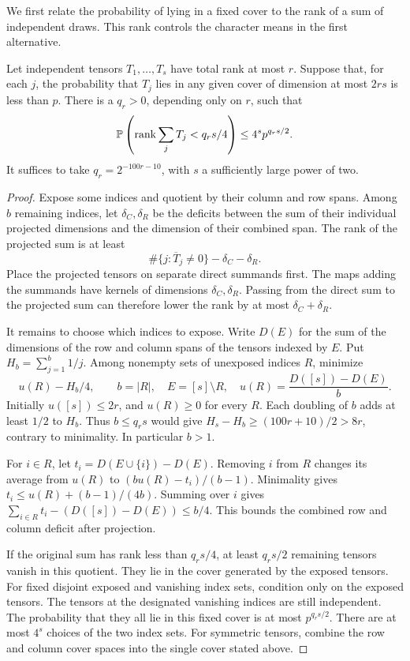 We first relate the probability of lying in a fixed cover to the
rank of a sum of independent draws. This rank controls the character
means in the first alternative.

\begin{lemma}\label{lem:no-cover-rank}
Let independent tensors \(T_1,\ldots,T_s\) have total rank at most \(r\).
Suppose that, for each \(j\), the probability that \(T_j\) lies in any
given cover of dimension at most \(2rs\) is less than \(p\). There is a
\(q_r>0\), depending only on \(r\), such that
\[
 \mathbb P\left(\operatorname{rank}\sum_jT_j<q_rs/4\right)\le4^sp^{q_rs/2}.
\]
It suffices to take \(q_r=2^{-100r-10}\), with \(s\) a sufficiently
large power of two.
\end{lemma}
\begin{proof}
Expose some indices and quotient by their column and row spans. Among
\(b\) remaining indices, let \(\delta_C,\delta_R\) be the deficits
between the sum of their individual projected dimensions and the dimension
of their combined span. The rank of the projected sum is at least
\[
 \#\{j:\overline T_j\ne0\}-\delta_C-\delta_R.
\]
Place the projected tensors on separate direct summands first. The maps
adding the summands have kernels of dimensions \(\delta_C,\delta_R\).
Passing from the direct sum to the projected sum can therefore lower
the rank by at most \(\delta_C+\delta_R\).

It remains to choose which indices to expose. Write \(D(E)\) for the
sum of the dimensions of the row and column spans of the tensors indexed
by \(E\). Put \(H_b=\sum_{j=1}^b1/j\). Among nonempty sets of unexposed
indices \(R\), minimize
\[
  u(R)-H_b/4,\qquad b=|R|,\quad E=[s]\setminus R,\quad
  u(R)=\frac{D([s])-D(E)}{b}.
\]
Initially \(u([s])\le 2r\), and \(u(R)\ge0\) for every \(R\).
Each doubling of \(b\) adds at least \(1/2\) to \(H_b\). Thus
\(b\le q_rs\) would give \(H_s-H_b\ge(100r+10)/2>8r\),
contrary to minimality. In particular \(b>1\).

For \(i\in R\), let \(t_i=D(E\cup\{i\})-D(E)\). Removing \(i\) from
\(R\) changes its average from \(u(R)\) to \((bu(R)-t_i)/(b-1)\).
Minimality gives \(t_i\le u(R)+(b-1)/(4b)\). Summing over \(i\)
gives \(\sum_{i\in R}t_i-(D([s])-D(E))\le b/4\).
This bounds the combined row and column deficit after projection.

If the original sum has rank less than \(q_rs/4\), at least \(q_rs/2\)
remaining tensors vanish in this quotient. They lie in the cover generated
by the exposed tensors. For fixed disjoint exposed and vanishing index
sets, condition only on the exposed tensors. The tensors at the designated vanishing indices are still independent.
The probability that they all lie in this fixed cover is at most \(p^{q_rs/2}\). There are at most
\(4^s\) choices of the two index sets. For symmetric tensors, combine the
row and column cover spaces into the single cover stated above.
\end{proof}

